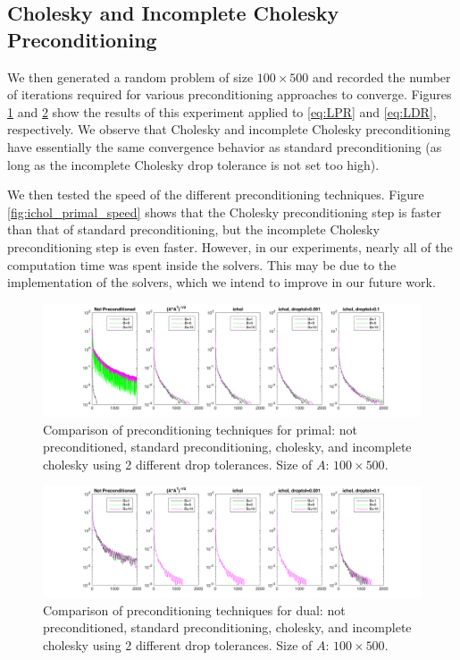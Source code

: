 \documentclass{article}
\begin{document}
\subsection*{Cholesky and Incomplete Cholesky Preconditioning}
We then generated a random problem of size $100\times500$ and recorded the number of iterations required for various preconditioning approaches to converge. Figures \ref{fig:ichol_primal} and \ref{fig:ichol_dual} show the results of this experiment applied to \eqref{eq:LPR} and \eqref{eq:LDR}, respectively. We observe that Cholesky and incomplete Cholesky preconditioning have essentially the same convergence behavior as standard preconditioning (as long as the incomplete Cholesky drop tolerance is not set too high).

We then tested the speed of the different preconditioning techniques. Figure \ref{fig:ichol_primal_speed} shows that the Cholesky preconditioning step is faster than that of standard preconditioning, but the incomplete Cholesky preconditioning step is even faster. However, in our experiments, nearly all of the computation time was spent inside the solvers. This may be due to the implementation of the solvers, which we intend to improve in our future work.

\begin{figure}[ht]
	\centering
	\includegraphics[width=1.0\textwidth]{../../experiments/incomplete_cholesky/ichol_droptol_conv_primal.png}
	\caption{Comparison of preconditioning techniques for primal: not preconditioned, standard preconditioning, cholesky, and incomplete cholesky using 2 different drop tolerances. Size of $A$: $100 \times 500$.}
	\label{fig:ichol_primal}
\end{figure}

\begin{figure}[ht]
	\centering
	\includegraphics[width=1.0\textwidth]{../../experiments/incomplete_cholesky/ichol_droptol_conv_dual.png}
	\caption{Comparison of preconditioning techniques for dual: not preconditioned, standard preconditioning, cholesky, and incomplete cholesky using 2 different drop tolerances. Size of $A$: $100 \times 500$.}
	\label{fig:ichol_dual}
\end{figure}
\end{document}
